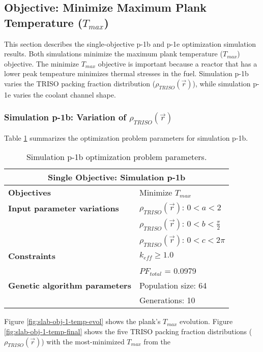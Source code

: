 \subsection{Objective: Minimize Maximum Plank Temperature ($T_{max}$)}
\label{sec:plank-1-obj-temp}
This section describes the single-objective p-1b and p-1e optimization simulation
results. 
Both simulations minimize the maximum plank temperature ($T_{max}$) objective. 
The minimize $T_{max}$ objective is important because a reactor that has a lower 
peak tempeature minimizes thermal stresses in the fuel. 
Simulation p-1b varies the \gls{TRISO} packing fraction distribution 
($\rho_{TRISO}(\vec{r})$), while simulation p-1e varies the coolant channel shape. 

\subsubsection{Simulation p-1b: Variation of $\rho_{TRISO}(\vec{r})$}
Table \ref{tab:simulationp1b} summarizes the optimization problem parameters for 
simulation p-1b.  
\begin{table}[htbp!]
    \centering
    \onehalfspacing
    \caption{Simulation p-1b optimization problem parameters.}
	\label{tab:simulationp1b}
    \footnotesize
    \begin{tabular}{l|p{4cm}}
    \hline 
    \multicolumn{2}{c}{\textbf{Single Objective: Simulation p-1b}} \\
    \hline 
    \textbf{Objectives} & Minimize $T_{max}$ \\
    \hline 
    \textbf{Input parameter variations}     
    & $\rho_{TRISO}(\vec{r})$: $0<a<2$ \\
    & $\rho_{TRISO}(\vec{r})$: $0<b<\frac{\pi}{2}$ \\
    & $\rho_{TRISO}(\vec{r})$: $0<c<2\pi$ \\
    \hline
    \textbf{Constraints} & $k_{eff} \geq 1.0$\\ 
    & $PF_{total}$ = 0.0979\\
    \hline 
    \textbf{Genetic algorithm parameters} & Population size: 64 \\
    & Generations: 10 \\
    \hline
    \end{tabular}
\end{table}
Figure \ref{fig:slab-obj-1-temp-evol} shows the plank's $T_{max}$ evolution. 
Figure \ref{fig:slab-obj-1-temp-final} shows the five \gls{TRISO} packing fraction
distributions ($\rho_{TRISO}(\vec{r})$) with the most-minimized $T_{max}$ from the 

